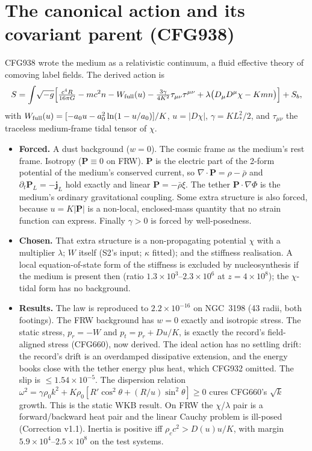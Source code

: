 \documentclass[10pt]{article}
\begin{document}
\section{The canonical action and its covariant parent (CFG938)}
CFG938 wrote the medium as a relativistic continuum, a fluid effective theory of comoving label fields. The derived action is
\[
S=\int\!\sqrt{-g}\Big[\tfrac{c^4R}{16\pi G}-mc^2n-W_{\rm full}(u)-\tfrac{3\gamma}{4K^2}\tau_{\mu\nu}\tau^{\mu\nu}+\lambda\big(D_\mu D^\mu\chi-Kmn\big)\Big]+S_b,
\]
with $W_{\rm full}(u)=[-a_0u-a_0^2\ln(1-u/a_0)]/K$, $u=|D\chi|$, $\gamma=KL_*^2/2$, and $\tau_{\mu\nu}$ the traceless medium-frame tidal tensor of $\chi$.
\begin{itemize}
\item \textbf{Forced.} A dust background ($w=0$). The cosmic frame as the medium's rest frame. Isotropy ($\mathbf P\equiv0$ on FRW). $\mathbf P$ is the electric part of the 2-form potential of the medium's conserved current, so $\nabla\cdot\mathbf P=\rho-\bar\rho$ and $\partial_t\mathbf P_L=-\mathbf j_L$ hold exactly and linear $\mathbf P=-\bar\rho\xi$. The tether $\mathbf P\cdot\nabla\Phi$ is the medium's ordinary gravitational coupling. Some extra structure is also forced, because $u=K|\mathbf P|$ is a non-local, enclosed-mass quantity that no strain function can express. Finally $\gamma>0$ is forced by well-posedness.
\item \textbf{Chosen.} That extra structure is a non-propagating potential $\chi$ with a multiplier $\lambda$; $W$ itself (S2's input; $\kappa$ fitted); and the stiffness realisation. A local equation-of-state form of the stiffness is excluded by nucleosynthesis if the medium is present then (ratio $1.3\times10^3$--$2.3\times10^6$ at $z=4\times10^8$); the $\chi$-tidal form has no background.
\item \textbf{Results.} The law is reproduced to $2.2\times10^{-16}$ on NGC~3198 (43 radii, both footings). The FRW background has $w=0$ exactly and isotropic stress. The static stress, $p_r=-W$ and $p_t=p_r+Du/K$, is exactly the record's field-aligned stress (CFG660), now derived. The ideal action has no settling drift: the record's drift is an overdamped dissipative extension, and the energy books close with the tether energy plus heat, which CFG932 omitted. The slip is $\le1.54\times10^{-5}$. The dispersion relation $\omega^2=\gamma\rho_0k^2+K\rho_0[R'\cos^2\theta+(R/u)\sin^2\theta]\ge0$ cures CFG660's $\sqrt k$ growth. This is the static WKB result. On FRW the $\chi$/$\lambda$ pair is a forward/backward heat pair and the linear Cauchy problem is ill-posed (Correction v1.1). Inertia is positive iff $\rho_cc^2>D(u)u/K$, with margin $5.9\times10^4$--$2.5\times10^8$ on the test systems.

\end{itemize}
\end{document}
